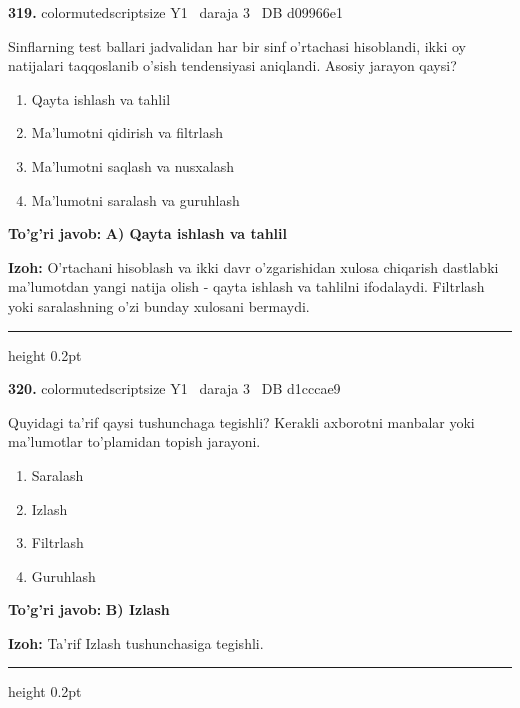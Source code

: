 \documentclass[10pt,a4paper,oneside]{article}
\begin{document}
\noindent\textbf{\color{ink}319.}  {color{muted}scriptsize Y1 \textbullet\ daraja 3 \textbullet\ DB d09966e1}
\par
Sinflarning test ballari jadvalidan har bir sinf o'rtachasi hisoblandi, ikki oy natijalari taqqoslanib o'sish tendensiyasi aniqlandi. Asosiy jarayon qaysi?
\begin{enumerate}[label=\Alph*),leftmargin=9mm]
\item Qayta ishlash va tahlil
\item Ma'lumotni qidirish va filtrlash
\item Ma'lumotni saqlash va nusxalash
\item Ma'lumotni saralash va guruhlash
\end{enumerate}
\begin{tcolorbox}[enhanced,breakable,colback=teal!4,colframe=teal!50!black,boxrule=0.5pt,arc=1.1mm,left=3mm,right=3mm,top=1.7mm,bottom=1.7mm,before skip=2mm,after skip=2mm]
\textbf{\color{teal}To'g'ri javob:} \textbf{A) Qayta ishlash va tahlil}
\par\smallskip
\textbf{Izoh:} O'rtachani hisoblash va ikki davr o'zgarishidan xulosa chiqarish dastlabki ma'lumotdan yangi natija olish - qayta ishlash va tahlilni ifodalaydi. Filtrlash yoki saralashning o'zi bunday xulosani bermaydi.
\end{tcolorbox}
\vspace{2mm}\hrule height 0.2pt \vspace{3mm}

\noindent\textbf{\color{ink}320.}  {color{muted}scriptsize Y1 \textbullet\ daraja 3 \textbullet\ DB d1cccae9}
\par
Quyidagi ta'rif qaysi tushunchaga tegishli? Kerakli axborotni manbalar yoki ma'lumotlar to'plamidan topish jarayoni.
\begin{enumerate}[label=\Alph*),leftmargin=9mm]
\item Saralash
\item Izlash
\item Filtrlash
\item Guruhlash
\end{enumerate}
\begin{tcolorbox}[enhanced,breakable,colback=teal!4,colframe=teal!50!black,boxrule=0.5pt,arc=1.1mm,left=3mm,right=3mm,top=1.7mm,bottom=1.7mm,before skip=2mm,after skip=2mm]
\textbf{\color{teal}To'g'ri javob:} \textbf{B) Izlash}
\par\smallskip
\textbf{Izoh:} Ta'rif Izlash tushunchasiga tegishli.
\end{tcolorbox}
\vspace{2mm}\hrule height 0.2pt \vspace{3mm}
\end{document}
